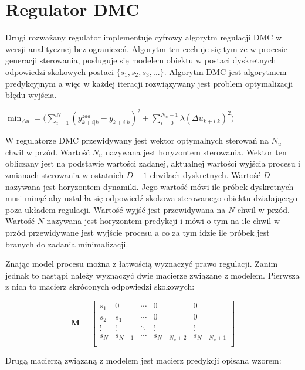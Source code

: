 \documentclass[a4paper,titlepage,11pt,floatssmall]{mwrep}
\begin{document}
\section{Regulator DMC}
Drugi rozważany regulator implementuje cyfrowy algorytm regulacji DMC w wersji analitycznej bez ograniczeń. Algorytm ten cechuje się tym że w procesie generacji sterowania, posługuje się modelem obiektu w postaci dyskretnych odpowiedzi skokowych postaci $\{s_1, s_2, s_3, ...\}$. Algorytm DMC jest algorytmem predykcyjnym a więc w każdej iteracji rozwiązywany jest problem optymalizacji błędu wyjścia.

\begin{center}

$\min_{\Delta u} = \bigg( \sum_{i=1}^{N}(y_{k+i|k}^{zad} - y_{k+i|k})^2 + \sum_{i=0}^{N_{u} - 1}\lambda(\Delta u_{k+i|k})^2 \bigg)$

\end{center}

W regulatorze DMC przewidywany jest wektor optymalnych sterowań na $N_u$ chwil w przód. Wartość $N_u$ nazywana jest horyzontem sterowania. Wektor ten obliczany jest na podstawie wartości zadanej, aktualnej wartości wyjścia procesu i zmianach sterowania w ostatnich $D-1$ chwilach dyskretnych. Wartość $D$ nazywana jest horyzontem dynamiki. Jego wartość mówi ile próbek dyskretnych musi minąć aby ustaliła się odpowiedź skokowa sterowanego obiektu działającego poza układem regulacji. Wartość wyjść jest przewidywana na $N$ chwil w przód. Wartość $N$ nazywana jest horyzontem predykcji i mówi o tym na ile chwil w przód przewidywane jest wyjście procesu a co za tym idzie ile próbek jest branych do zadania minimalizacji.\\
\newpage

Znając model procesu można z łatwością wyznaczyć prawo regulacji. Zanim jednak to nastąpi należy wyznaczyć dwie macierze związane z modelem. Pierwsza z nich to macierz skróconych odpowiedzi skokowych:

$$
\mathbf{M} =
\left[ \begin{array}{ccccc}
s_1 & 0 & \cdots & 0 & 0\\
s_2 & s_1 & \cdots & 0 & 0\\
\vdots & \vdots & \ddots & \vdots & \vdots  \\
s_N & s_{N-1} & \cdots & s_{N - N_u + 2}& s_{N - N_u + 1}\\
\end{array} \right]
$$

Drugą macierzą związaną z modelem jest macierz predykcji opisana wzorem:
\end{document}
